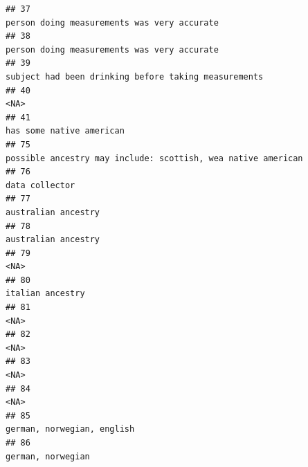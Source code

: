 \documentclass[]{article}
\begin{document}
\begin{verbatim}
## 37                                                                                                          person doing measurements was very accurate
## 38                                                                                                          person doing measurements was very accurate
## 39                                                                                                 subject had been drinking before taking measurements
## 40                                                                                                                                                 <NA>
## 41                                                                                                                             has some native american
## 75                                                                                         possible ancestry may include: scottish, wea native american
## 76                                                                                                                                       data collector
## 77                                                                                                                                  australian ancestry
## 78                                                                                                                                  australian ancestry
## 79                                                                                                                                                 <NA>
## 80                                                                                                                                     italian ancestry
## 81                                                                                                                                                 <NA>
## 82                                                                                                                                                 <NA>
## 83                                                                                                                                                 <NA>
## 84                                                                                                                                                 <NA>
## 85                                                                                                                           german, norwegian, english
## 86                                                                                                                                    german, norwegian

\end{verbatim}
\end{document}
